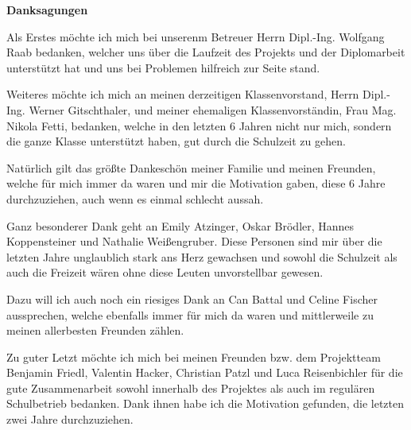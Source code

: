 \begin{flushleft}
	\Large
	\textbf{Danksagungen\\}
	\vspace{1.5cm}
	
	\large
	Als Erstes möchte ich mich bei unserenm Betreuer Herrn Dipl.-Ing. Wolfgang Raab bedanken, welcher uns über die Laufzeit des Projekts und der Diplomarbeit unterstützt hat und uns bei Problemen hilfreich zur Seite stand.

    Weiteres möchte ich mich an meinen derzeitigen Klassenvorstand, Herrn Dipl.-Ing. Werner Gitschthaler, und meiner ehemaligen Klassenvorständin, Frau Mag. Nikola Fetti, bedanken, welche in den letzten 6 Jahren nicht nur mich, sondern die ganze Klasse unterstützt haben, gut durch die Schulzeit zu gehen. 

    Natürlich gilt das größte Dankeschön meiner Familie und meinen Freunden, welche für mich immer da waren und mir die Motivation gaben, diese 6 Jahre durchzuziehen, auch wenn es einmal schlecht aussah.

    Ganz besonderer Dank geht an Emily Atzinger, Oskar Brödler, Hannes Koppensteiner und Nathalie Weißengruber. Diese Personen sind mir über die letzten Jahre unglaublich stark ans Herz gewachsen und sowohl die Schulzeit als auch die Freizeit wären ohne diese Leuten unvorstellbar gewesen.

    Dazu will ich auch noch ein riesiges Dank an Can Battal und Celine Fischer aussprechen, welche ebenfalls immer für mich da waren und mittlerweile zu meinen allerbesten Freunden zählen.

    Zu guter Letzt möchte ich mich bei meinen Freunden bzw. dem Projektteam Benjamin Friedl, Valentin Hacker, Christian Patzl und Luca Reisenbichler für die gute Zusammenarbeit sowohl innerhalb des Projektes als auch im regulären Schulbetrieb bedanken. Dank ihnen habe ich die Motivation gefunden, die letzten zwei Jahre durchzuziehen.

    
\end{flushleft}